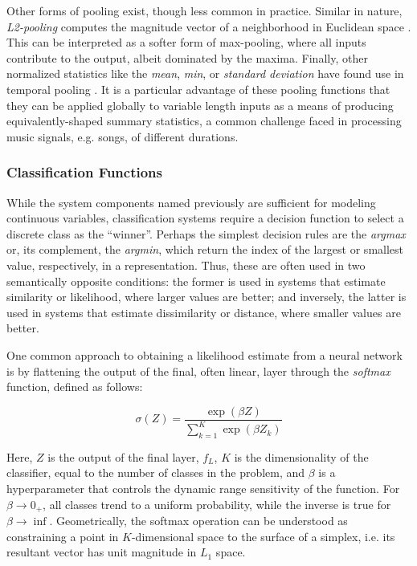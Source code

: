 
Other forms of pooling exist, though less common in practice.
Similar in nature, \emph{L2-pooling} computes the magnitude vector of a neighborhood in Euclidean space \cite{LeCunStudent}.
This can be interpreted as a softer form of max-pooling, where all inputs contribute to the output, albeit dominated by the maxima.
Finally, other normalized statistics like the \emph{mean}, \emph{min}, or \emph{standard deviation} have found use in temporal pooling \cite{Hamel2011}.
It is a particular advantage of these pooling functions that they can be applied globally to variable length inputs as a means of producing equivalently-shaped summary statistics, a common challenge faced in processing music signals, e.g. songs, of different durations.


\subsubsection{Classification Functions}

While the system components named previously are sufficient for modeling continuous variables, classification systems require a decision function to select a discrete class as the ``winner''.
Perhaps the simplest decision rules are the \emph{argmax} or, its complement, the \emph{argmin}, which return the index of the largest or smallest value, respectively, in a representation.
Thus, these are often used in two semantically opposite conditions:
the former is used in systems that estimate similarity or likelihood, where larger values are better;
and inversely, the latter is used in systems that estimate dissimilarity or distance, where smaller values are better.

One common approach to obtaining a likelihood estimate from a neural network is by flattening the output of the final, often linear, layer through the \emph{softmax} function, defined as follows:

\begin{equation}
\label{eq:softmax}
\sigma(Z) = \frac{\exp(\beta Z)}{ \sum_{k=1}^{K}\exp{(\beta Z_k)}}
\end{equation}

\noindent Here, $Z$ is the output of the final layer, $f_L$, $K$ is the dimensionality of the classifier, equal to the number of classes in the problem, and $\beta$ is a hyperparameter that controls the dynamic range sensitivity of the function.
For $\beta \to 0_+$, all classes trend to a uniform probability, while the inverse is true for $\beta \to \inf$.
Geometrically, the softmax operation can be understood as constraining a point in $K$-dimensional space to the surface of a simplex, i.e. its resultant vector has unit magnitude in $L_1$ space.

